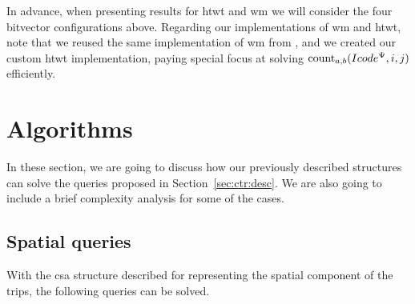 	In advance, when presenting results for \gls{htwt} and \gls{wm} we will consider the four bitvector configurations
	above. Regarding our implementations of \gls{wm} and \gls{htwt}, note that we reused the same implementation of \gls{wm} from \cite{CNO15}, 
	and we created our custom \gls{htwt} implementation, paying special focus at solving $\operatorname{count}_{a,b}(Icode^{\Psi},i,j)$ efficiently.

\section{Algorithms} \label{sec:ctr:alg}
	In these section, we are going to discuss how our previously described structures can solve the queries proposed in Section~\ref{sec:ctr:desc}. We are also going to include a brief complexity analysis for some of the cases.

	\subsection{Spatial queries}
	\label{sec:ctr:alg:sq}

	With the \gls{csa} structure described for representing the spatial component of the trips,
	the following queries can be solved.

